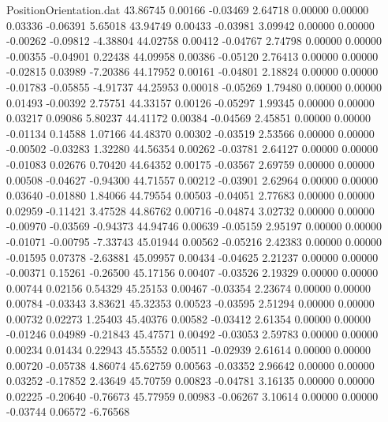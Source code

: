 \begin{filecontents}{PositionOrientation.dat}
  43.86745    0.00166   -0.03469     2.64718    0.00000    0.00000    0.03336   -0.06391    5.65018
  43.94749    0.00433   -0.03981     3.09942    0.00000    0.00000   -0.00262   -0.09812   -4.38804
  44.02758    0.00412   -0.04767     2.74798    0.00000    0.00000   -0.00355   -0.04901    0.22438
  44.09958    0.00386   -0.05120     2.76413    0.00000    0.00000   -0.02815    0.03989   -7.20386
  44.17952    0.00161   -0.04801     2.18824    0.00000    0.00000   -0.01783   -0.05855   -4.91737
  44.25953    0.00018   -0.05269     1.79480    0.00000    0.00000    0.01493   -0.00392    2.75751
  44.33157    0.00126   -0.05297     1.99345    0.00000    0.00000    0.03217    0.09086    5.80237
  44.41172    0.00384   -0.04569     2.45851    0.00000    0.00000   -0.01134    0.14588    1.07166
  44.48370    0.00302   -0.03519     2.53566    0.00000    0.00000   -0.00502   -0.03283    1.32280
  44.56354    0.00262   -0.03781     2.64127    0.00000    0.00000   -0.01083    0.02676    0.70420
  44.64352    0.00175   -0.03567     2.69759    0.00000    0.00000    0.00508   -0.04627   -0.94300
  44.71557    0.00212   -0.03901     2.62964    0.00000    0.00000    0.03640   -0.01880    1.84066
  44.79554    0.00503   -0.04051     2.77683    0.00000    0.00000    0.02959   -0.11421    3.47528
  44.86762    0.00716   -0.04874     3.02732    0.00000    0.00000   -0.00970   -0.03569   -0.94373
  44.94746    0.00639   -0.05159     2.95197    0.00000    0.00000   -0.01071   -0.00795   -7.33743
  45.01944    0.00562   -0.05216     2.42383    0.00000    0.00000   -0.01595    0.07378   -2.63881
  45.09957    0.00434   -0.04625     2.21237    0.00000    0.00000   -0.00371    0.15261   -0.26500
  45.17156    0.00407   -0.03526     2.19329    0.00000    0.00000    0.00744    0.02156    0.54329
  45.25153    0.00467   -0.03354     2.23674    0.00000    0.00000    0.00784   -0.03343    3.83621
  45.32353    0.00523   -0.03595     2.51294    0.00000    0.00000    0.00732    0.02273    1.25403
  45.40376    0.00582   -0.03412     2.61354    0.00000    0.00000   -0.01246    0.04989   -0.21843
  45.47571    0.00492   -0.03053     2.59783    0.00000    0.00000    0.00234    0.01434    0.22943
  45.55552    0.00511   -0.02939     2.61614    0.00000    0.00000    0.00720   -0.05738    4.86074
  45.62759    0.00563   -0.03352     2.96642    0.00000    0.00000    0.03252   -0.17852    2.43649
  45.70759    0.00823   -0.04781     3.16135    0.00000    0.00000    0.02225   -0.20640   -0.76673
  45.77959    0.00983   -0.06267     3.10614    0.00000    0.00000   -0.03744    0.06572   -6.76568

\end{filecontents}
